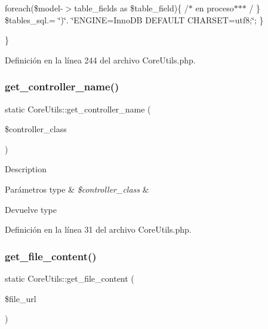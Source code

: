 foreach(\$model-\/$>$table\+\_\+fields as \$table\+\_\+field)\{ /$\ast$ en proceso$\ast$$\ast$$\ast$ / \} \$tables\+\_\+sql.= \char`\"{})\char`\"{}. \char`\"{}\+E\+N\+G\+I\+N\+E=\+Inno\+D\+B D\+E\+F\+A\+U\+L\+T C\+H\+A\+R\+S\+E\+T=utf8;\char`\"{}; \}

\} 

Definición en la línea 244 del archivo Core\+Utils.\+php.

\mbox{\label{class_core_utils_ada9d6950d7ad8d0199d823939b727479}} 
\subsubsection{\texorpdfstring{get\_controller\_name()}{get\_controller\_name()}}
{\footnotesize\ttfamily static Core\+Utils\+::get\+\_\+controller\+\_\+name (\begin{DoxyParamCaption}\item[{}]{\$controller\+\_\+class }\end{DoxyParamCaption})\hspace{0.3cm}{\ttfamily [static]}}

Description 
\begin{DoxyParams}[1]{Parámetros}
type & {\em \$controller\+\_\+class} & \\
\hline
\end{DoxyParams}
\begin{DoxyReturn}{Devuelve}
type 
\end{DoxyReturn}


Definición en la línea 31 del archivo Core\+Utils.\+php.

\mbox{\label{class_core_utils_a53e64d1ce4c4369cdc8bf4176ebce031}} 
\subsubsection{\texorpdfstring{get\_file\_content()}{get\_file\_content()}}
{\footnotesize\ttfamily static Core\+Utils\+::get\+\_\+file\+\_\+content (\begin{DoxyParamCaption}\item[{}]{\$file\+\_\+url }\end{DoxyParamCaption})\hspace{0.3cm}{\ttfamily [static]}}

